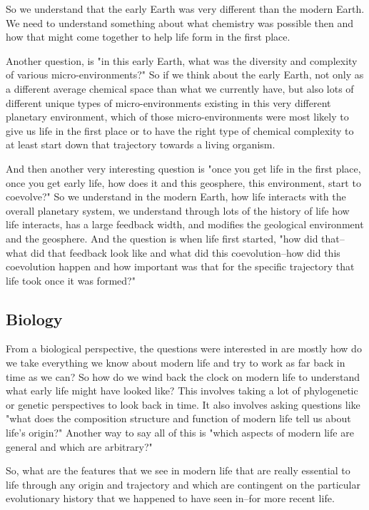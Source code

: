\documentclass[]{article}
\begin{document}
So we understand that the early Earth was
very different than the modern Earth.
We need to understand something about
what chemistry was possible then
and how that might come together to help
life form in the first place.

Another question, is "in this early Earth,
what was the diversity and complexity of
various micro-environments?"
So if we think about the early Earth, not
only as a different average chemical
space than what we currently have, but
also lots of different unique types of
micro-environments existing in this very
different planetary environment, which of
those micro-environments were most likely
to give us life in the first place or to
have the right type of chemical complexity
to at least start down that trajectory
towards a living organism.

And then another very interesting question
is "once you get life in the first place,
once you get early life, how does it and
this geosphere, this environment,
start to coevolve?"
So we understand in the modern Earth, how
life interacts with the overall planetary
system, we understand through lots of the
history of life how life interacts,
has a large feedback width, and modifies
the geological environment and the
geosphere. And the question is when life
first started, "how did that--what did
that feedback look like and what did this
coevolution--how did this coevolution
happen and how important was that for the
specific trajectory that life took once
it was formed?"

\subsection{Biology}	
From a biological perspective, the
questions were interested in are mostly
how do we take everything we know about
modern life and try to work as far back in
time as we can? So how do we wind back the
clock on modern life to understand what
early life might have looked like?
This involves taking a lot of
phylogenetic or genetic perspectives to
look back in time. It also involves
asking questions like "what does the
composition structure and function of
modern life tell us about life's origin?"
Another way to say all of this is "which
aspects of modern life are general and
which are arbitrary?"

So, what are the features that we see in
modern life that are really essential to
life through any origin and trajectory and
which are contingent on the particular
evolutionary history that we happened to
have seen in--for more recent life.
\end{document}
